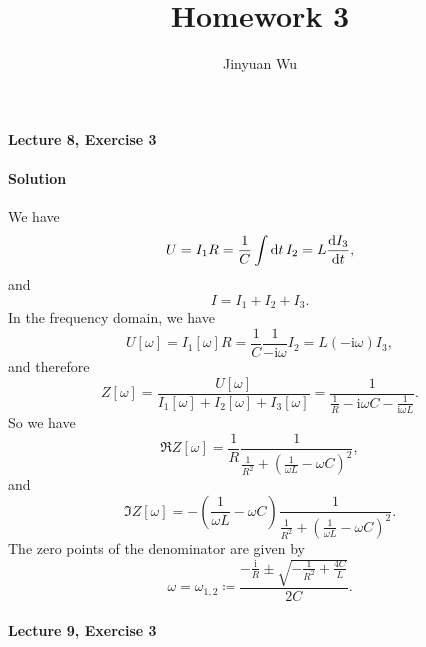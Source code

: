 \documentclass[hyperref, a4paper]{article}
\title{Homework 3}
\author{Jinyuan Wu}
\newcommand*{\ii}{\mathrm{i}}
\begin{document}
\maketitle

\paragraph{Lecture 8, Exercise 3}

\paragraph{Solution} We have 
\[
    U = I_1 R = \frac{1}{C} \int \dd{t} I_2 = L \dv{I_3}{t},
\]
and 
\[
    I = I_1 + I_2 + I_3.
\]
In the frequency domain, we have 
\[
    U[\omega] = I_1[\omega] R = \frac{1}{C} \frac{1}{- \ii \omega} I_2 = L (- \ii \omega) I_3,
\]
and therefore 
\begin{equation}
    Z[\omega] = \frac{U[\omega]}{I_1[\omega] + I_2[\omega] + I_3[\omega]} 
    = \frac{1}{\frac{1}{R} - \ii \omega C - \frac{1}{\ii \omega L}}.
\end{equation}
So we have 
\begin{equation}
    \Re Z[\omega] = \frac{1}{R} \frac{1}{\frac{1}{R^2} + \left( \frac{1}{\omega L} - \omega C \right)^2},
\end{equation}
and 
\begin{equation}
    \Im Z[\omega] = - \left( \frac{1}{\omega L} - \omega C \right) \frac{1}{\frac{1}{R^2} + \left( \frac{1}{\omega L} - \omega C \right)^2}.
\end{equation}
The zero points of the denominator are given by 
\begin{equation}
    \omega = \omega_{1, 2} \coloneqq \frac{- \frac{\ii}{R} \pm \sqrt{- \frac{1}{R^2} + \frac{4C}{L}}}{2 C}.
\end{equation}

\paragraph{Lecture 9, Exercise 3} 
\end{document}
